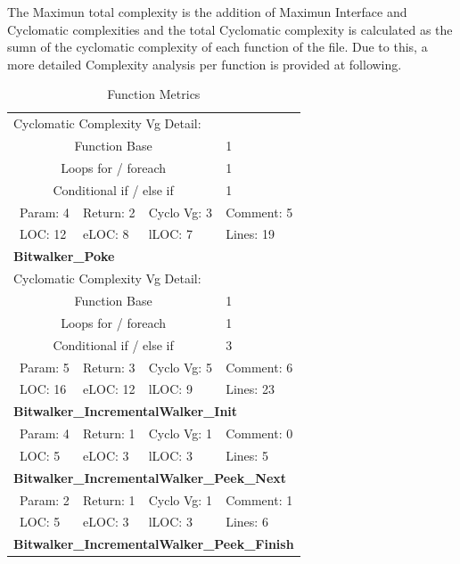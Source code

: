 The Maximun total complexity is the addition of Maximun Interface and Cyclomatic complexities and the total Cyclomatic complexity is calculated as the sumn of the cyclomatic complexity of each function of the file. Due to this, a more detailed Complexity analysis per function is provided at following.

\begin{longtable}{||p{}|p{}|p{}|p{}||}
  \caption{Function Metrics}\\
    \hline\hline
    \endhead
    \hline\hline
    \endfoot
\multicolumn{4}{||l||}{\textbf{Bitwalker\_Peek}}
\\\hline
\multicolumn{4}{||l||}{Cyclomatic Complexity Vg Detail:}
\\\hline
\multicolumn{3}{||c|}{Function Base} & 1
\\\hline
\multicolumn{3}{||c|}{Loops for / foreach} & 1
\\\hline
\multicolumn{3}{||c|}{Conditional if / else if} & 1
\\\hline
\ Param: 4 &
Return: 2 &
Cyclo Vg: 3 &
Comment: 5
 \\\hline
\ LOC: 12 &
eLOC: 8 &
lLOC: 7 &
Lines: 19
 \\\hline
\multicolumn{4}{||l||}{\textbf{Bitwalker\_Poke}}
\\\hline
\multicolumn{4}{||l||}{Cyclomatic Complexity Vg Detail:}
\\\hline
\multicolumn{3}{||c|}{Function Base} & 1
\\\hline
\multicolumn{3}{||c|}{Loops for / foreach} & 1
\\\hline
\multicolumn{3}{||c|}{Conditional if / else if} & 3
\\\hline
\ Param: 5 &
Return: 3 &
Cyclo Vg: 5 &
Comment: 6
 \\\hline
\ LOC: 16 &
eLOC: 12 &
lLOC: 9 &
Lines: 23
 \\\hline
\multicolumn{4}{||l||}{\textbf{Bitwalker\_IncrementalWalker\_Init}}
\\\hline
\ Param: 4 &
Return: 1 &
Cyclo Vg: 1 &
Comment: 0
 \\\hline
\ LOC: 5 &
eLOC: 3 &
lLOC: 3 &
Lines: 5
 \\\hline
\multicolumn{4}{||l||}{\textbf{Bitwalker\_IncrementalWalker\_Peek\_Next}}
\\\hline
\ Param: 2 &
Return: 1 &
Cyclo Vg: 1 &
Comment: 1
 \\\hline
\ LOC: 5 &
eLOC: 3 &
lLOC: 3 &
Lines: 6
 \\\hline
\multicolumn{4}{||l||}{\textbf{Bitwalker\_IncrementalWalker\_Peek\_Finish}}

\end{longtable}
